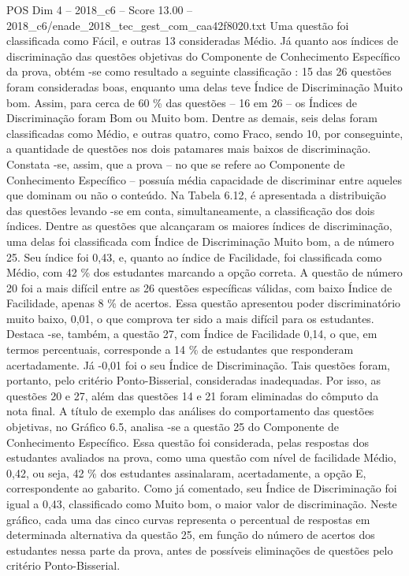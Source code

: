 \begin{textsample}{POS Dim 4 – 2018\_c6 – Score 13.00 – 2018\_c6/enade\_2018\_tec\_gest\_com\_caa42f8020.txt}
Uma questão foi classificada como Fácil, e outras 13 consideradas Médio.
Já quanto aos índices de discriminação das questões objetivas do Componente de Conhecimento Específico da prova, obtém -se como resultado a seguinte classificação : 15 das 26 questões foram consideradas boas, enquanto uma delas teve Índice de Discriminação Muito bom.
Assim, para cerca de 60 \% das questões – 16 em 26 – os Índices de Discriminação foram Bom ou Muito bom.
Dentre as demais, seis delas foram classificadas como Médio, e outras quatro, como Fraco, sendo 10, por conseguinte, a quantidade de questões nos dois patamares mais baixos de discriminação.
Constata -se, assim, que a prova – no que se refere ao Componente de Conhecimento Específico – possuía média capacidade de discriminar entre aqueles que dominam ou não o conteúdo.
Na Tabela 6.12, é apresentada a distribuição das questões levando -se em conta, simultaneamente, a classificação dos dois índices.
Dentre as questões que alcançaram os maiores índices de discriminação, uma delas foi classificada com Índice de Discriminação Muito bom, a de número 25.
Seu índice foi 0,43, e, quanto ao índice de Facilidade, foi classificada como Médio, com 42 \% dos estudantes marcando a opção correta.
A questão de número 20 foi a mais difícil entre as 26 questões específicas válidas, com baixo Índice de Facilidade, apenas 8 \% de acertos.
Essa questão apresentou poder discriminatório muito baixo, 0,01, o que comprova ter sido a mais difícil para os estudantes.
Destaca -se, também, a questão 27, com Índice de Facilidade 0,14, o que, em termos percentuais, corresponde a 14 \% de estudantes que responderam acertadamente.
Já -0,01 foi o seu Índice de Discriminação.
Tais questões foram, portanto, pelo critério Ponto-Bisserial, consideradas inadequadas.
Por isso, as questões 20 e 27, além das questões 14 e 21 foram eliminadas do cômputo da nota final.
A título de exemplo das análises do comportamento das questões objetivas, no Gráfico 6.5, analisa -se a questão 25 do Componente de Conhecimento Específico.
Essa questão foi considerada, pelas respostas dos estudantes avaliados na prova, como uma questão com nível de facilidade Médio, 0,42, ou seja, 42 \% dos estudantes assinalaram, acertadamente, a opção E, correspondente ao gabarito.
Como já comentado, seu Índice de Discriminação foi igual a 0,43, classificado como Muito bom, o maior valor de discriminação.
Neste gráfico, cada uma das cinco curvas representa o percentual de respostas em determinada alternativa da questão 25, em função do número de acertos dos estudantes nessa parte da prova, antes de possíveis eliminações de questões pelo critério Ponto-Bisserial.

\end{textsample}
